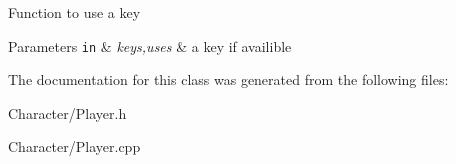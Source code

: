 Function to use a key 
\begin{DoxyParams}[1]{Parameters}
\mbox{\tt in}  & {\em keys,uses} & a key if availible \\
\hline
\end{DoxyParams}


The documentation for this class was generated from the following files\-:\begin{DoxyCompactItemize}
\item 
Character/Player.\-h\item 
Character/Player.\-cpp\end{DoxyCompactItemize}
